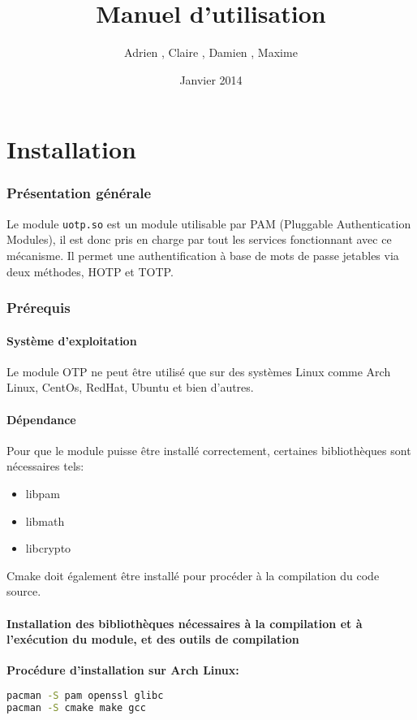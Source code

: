\documentclass{"../../../res/univ-projet"}
\title{Manuel d'utilisation}
\author{Adrien \bsc{Smondack}, Claire \bsc{Hardouin}, Damien \bsc{Picard}, Maxime \bsc{Michotte}}
\date{Janvier 2014}
\begin{document}
\maketitle
\tableofcontents

\newpage

\part{Installation}
\section{Présentation générale}
Le module \verb?uotp.so? est un module utilisable par PAM (Pluggable Authentication Modules), 
il est donc pris en charge par tout les services fonctionnant avec ce mécanisme. Il permet 
une authentification à base de mots de passe jetables via deux méthodes, HOTP et TOTP.

\label{prereq}
\section{Prérequis}
\subsection{Système d'exploitation}
Le module OTP ne peut être utilisé que sur des systèmes Linux comme Arch Linux, 
CentOs, RedHat, Ubuntu et bien d'autres.

\subsection{Dépendance}
Pour que le module puisse être installé correctement, certaines bibliothèques 
sont nécessaires tels:
\begin{itemize}
\item libpam
\item libmath
\item libcrypto
\end{itemize}
Cmake doit également être installé pour procéder à la compilation du code source.
\newline

\subsection{Installation des bibliothèques nécessaires à la compilation et à l'exécution du module, et des outils de compilation}
\textbf{Procédure d'installation sur Arch Linux:}\\
\begin{lstlisting}[language=bash, backgroundcolor=\color{black}, basicstyle=\color{white}]
pacman -S pam openssl glibc
pacman -S cmake make gcc
\end{lstlisting}
\end{document}
